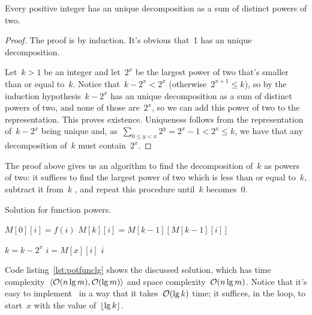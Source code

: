 \documentclass[main.tex]{subfiles}
\begin{document}
\begin{theorem} \label{thm:pot2}
        Every positive integer has an unique decomposition as a sum of distinct powers of two.
\end{theorem}
\begin{proof}
    The proof is by induction. It's obvious that~1 has an unique decomposition.

    Let~$k > 1$ be an integer and let~$2^x$ be the largest power of two that's smaller than or equal to~$k$. Notice that~$k - 2^x < 2^x$ (otherwise~$2^{x+1} \leq k$), so by the induction hypothesis~$k - 2^x$ has an unique decomposition as a sum of distinct powers of two, and none of those are~$2^x$, so we can add this power of two to the representation. This proves existence. Uniqueness follows from the representation of~$k - 2^x$ being unique and, as~$\sum\limits_{0 \leq y < x}{2^{y}} = 2^x - 1 < 2^x \leq k$, we have that any decomposition of~$k$ must contain~$2^x$.
\end{proof}

The proof above gives us an algorithm to find the decomposition of~$k$ as powers of two: it suffices to find the largest power of two which is less than or equal to~$k$, subtract it from~$k$ , and repeat this procedure until~$k$ becomes~0.

\begin{algorithm}
	\caption{Solution for function powers.} \label{lst:potfunclg}
\begin{algorithmic}[1]
			\State $M[0][i] = f(i)$
		\EndFor
				\State $M[k][i] = M[k - 1][M[k - 1][i]]$
			\EndFor
		\EndFor
	\EndFunction

	 
				\State $k = k - 2^x$
				\State $i = M[x][i]$
			\EndIf
		\EndFor
		\State \Return $i$
	\EndFunction
\end{algorithmic}
\end{algorithm}

Code listing~\ref{lst:potfunclg} shows the discussed solution, which has time complexity~$\langle\mathcal{O}(n\lg m), \mathcal{O}(\lg m)\rangle$ and space complexity~$\mathcal{O}(n \lg m)$. Notice that it's easy to implement~ in a way that it takes~$\mathcal{O}(\lg k)$ time; it suffices, in the loop, to start~$x$ with the value of~$\lfloor\lg k\rfloor$.
\end{document}
